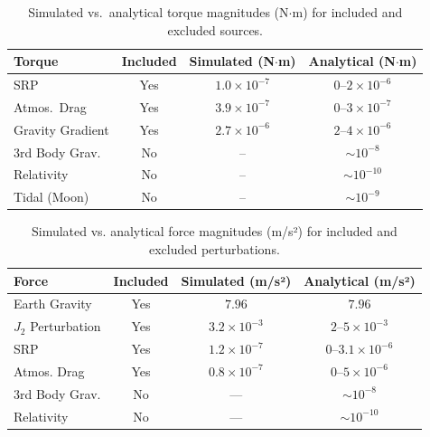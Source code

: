 \documentclass[final,3p,times,twocolumn]{elsarticle}
\begin{document}
\begin{table}[H]
\centering
\renewcommand{\arraystretch}{1.3}
\setlength{\tabcolsep}{4pt} %
\footnotesize
\begin{tabularx}{\linewidth}{@{}lccc@{}}
\toprule
\textbf{Torque} & \textbf{Included} & \textbf{Simulated (N$\cdot$m)} & \textbf{Analytical (N$\cdot$m)} \\
\midrule
SRP               & Yes & $1.0 \times 10^{-7}$       & $0$–$2 \times 10^{-6}$        \\
Atmos.\ Drag      & Yes & $3.9 \times 10^{-7}$       & $0$–$3 \times 10^{-7}$        \\
Gravity Gradient  & Yes & $2.7 \times 10^{-6}$       & $2$–$4 \times 10^{-6}$        \\
3rd Body Grav.    & No  & –                          & $\sim 10^{-8}$                \\
Relativity        & No  & –                          & $\sim 10^{-10}$               \\
Tidal (Moon)      & No  & –                          & $\sim 10^{-9}$                \\
\bottomrule
\end{tabularx}
\caption{Simulated vs.\ analytical torque magnitudes (N$\cdot$m) for included and excluded sources.}
\label{tab:torque_summary}
\end{table}


\begin{table}[H]
\centering
\renewcommand{\arraystretch}{1.3}
\setlength{\tabcolsep}{2pt}
\footnotesize
\begin{tabularx}{\linewidth}{lccc}
\toprule
\textbf{Force} & \textbf{Included} & \textbf{Simulated (m/s²)} & \textbf{Analytical (m/s²)} \\
\midrule
Earth Gravity         & Yes & $7.96$                   & $7.96$                   \\
\( J_2 \) Perturbation  & Yes & $3.2 \times 10^{-3}$    & $2$–$5 \times 10^{-3}$  \\
SRP                   & Yes & $1.2 \times 10^{-7}$    & $0$–$3.1 \times 10^{-6}$ \\
Atmos. Drag      & Yes & $0.8 \times 10^{-7}$    & $0$–$5 \times 10^{-6}$  \\
3rd Body Grav.    & No & —                       & $\sim 10^{-8}$       \\
Relativity  & No & —                       & $\sim 10^{-10}$     \\
\bottomrule
\end{tabularx}
\caption{Simulated vs. analytical force magnitudes (m/s²) for included and excluded perturbations.}
\label{tab:force_summary}
\end{table}
\end{document}

